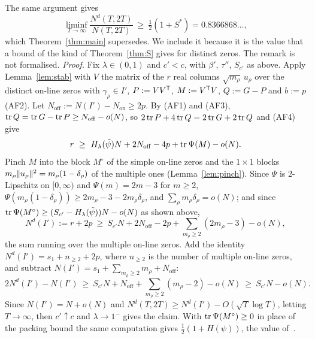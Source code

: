 \begin{remark}\label{rem:Sdist}
The same argument gives
\[
\liminf_{T\to\infty}\frac{N^d(T,2T)}{N(T,2T)}\ \ge\ \tfrac12(1+S^*)=0.8366868\ldots,
\]
which Theorem~\ref{thm:main} supersedes. We
include it because it is the value that a bound of the kind of Theorem~\ref{thm:S} gives for distinct zeros. The remark is not formalised.
\emph{Proof.} Fix $\lambda\in(0,1)$ and $c'<c$, with $\beta'$, $\tau''$, $S_{c'}$ as above. Apply Lemma~\ref{lem:stab} with $V$ the matrix of the $r$
real columns $\sqrt{m_\rho}\,u_\rho$ over the distinct on-line zeros with $\gamma_\rho\in I'$, $P:=VV^{\mathsf T}$, $M:=V^{\mathsf T}V$, $Q:=G-P$ and $b:=p$
(AF2). Let $N_{\mathrm{off}}:=N(I')-N_{\mathrm{on}}\ge2p$. By (AF1) and (AF3), $\operatorname{tr} Q=\operatorname{tr} G-\operatorname{tr} P\ge N_{\mathrm{off}}-o(N)$, so
$2\operatorname{tr} P+4\operatorname{tr} Q=2\operatorname{tr} G+2\operatorname{tr} Q$ and (AF4) give
\[
r\ \ge\ H_\lambda(\tilde\psi)N+2N_{\mathrm{off}}-4p+\tr\Psi(M)-o(N).
\]
Pinch $M$ into the block $M^\circ$ of the simple on-line zeros and the $1\times1$ blocks $m_\rho\lVert u_\rho\rVert^2=m_\rho(1-\delta_\rho)$ of the
multiple ones (Lemma~\ref{lem:pinch}). Since $\Psi$ is $2$-Lipschitz on $[0,\infty)$ and $\Psi(m)=2m-3$ for $m\ge2$,
$\Psi(m_\rho(1-\delta_\rho))\ge2m_\rho-3-2m_\rho\delta_\rho$, and $\sum_\rho m_\rho\delta_\rho=o(N)$; and since
$\operatorname{tr}\Psi(M^\circ)\ge(S_{c'}-H_\lambda(\tilde\psi))N-o(N)$ as shown above,
\[
N^d(I'):=r+2p\ \ge\ S_{c'}N+2N_{\mathrm{off}}-2p+\sum_{m_\rho\ge2}(2m_\rho-3)-o(N),
\]
the sum running over the multiple on-line zeros. Add the identity $N^d(I')=s_1+n_{\ge2}+2p$, where $n_{\ge2}$ is the number of multiple
on-line zeros, and subtract $N(I')=s_1+\sum_{m_\rho\ge2}m_\rho+N_{\mathrm{off}}$:
\[
2N^d(I')-N(I')\ \ge\ S_{c'}N+N_{\mathrm{off}}+\sum_{m_\rho\ge2}(m_\rho-2)-o(N)\ \ge\ S_{c'}N-o(N).
\]
Since $N(I')=N+o(N)$ and $N^d(T,2T)\ge N^d(I')-O(\sqrt T\log T)$, letting $T\to\infty$, then $c'\uparrow c$ and $\lambda\to1^-$ gives the claim.
With $\operatorname{tr}\Psi(M^\circ)\ge0$ in place of the packing bound the same computation gives $\frac12(1+H(\psi))$, the value
of~\cite[Theorem~A(ii)]{AF}.
\end{remark}
